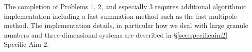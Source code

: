 The completion of Problems 1, 2, and especially 3 
requires additional algorithmic implementation including a
fast summation method such as the fast multipole method.
The implementation details, in particular how we deal with large
granule numbers and three-dimensional systems are
described in \S \ref{sec:specificaim2} Specific Aim 2.




